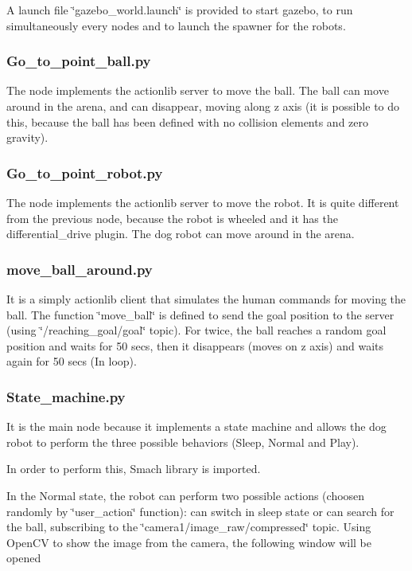 A launch file \char`\"{}gazebo\+\_\+world.\+launch\char`\"{} is provided to start gazebo, to run simultaneously every nodes and to launch the spawner for the robots.

\subsubsection*{Go\+\_\+to\+\_\+point\+\_\+ball.\+py}

The node implements the actionlib server to move the ball. The ball can move around in the arena, and can disappear, moving along z axis (it is possible to do this, because the ball has been defined with no collision elements and zero gravity).

\subsubsection*{Go\+\_\+to\+\_\+point\+\_\+robot.\+py}

The node implements the actionlib server to move the robot. It is quite different from the previous node, because the robot is wheeled and it has the differential\+\_\+drive plugin. The dog robot can move around in the arena.

\subsubsection*{move\+\_\+ball\+\_\+around.\+py}

It is a simply actionlib client that simulates the human commands for moving the ball. The function \char`\"{}move\+\_\+ball\char`\"{} is defined to send the goal position to the server (using \char`\"{}/reaching\+\_\+goal/goal\char`\"{} topic). For twice, the ball reaches a random goal position and waits for 50 secs, then it disappears (moves on z axis) and waits again for 50 secs (In loop).

\subsubsection*{State\+\_\+machine.\+py}

It is the main node because it implements a state machine and allows the dog robot to perform the three possible behaviors (Sleep, Normal and Play).

In order to perform this, Smach library is imported.

In the Normal state, the robot can perform two possible actions (choosen randomly by \char`\"{}user\+\_\+action\char`\"{} function)\+: can switch in sleep state or can search for the ball, subscribing to the \char`\"{}camera1/image\+\_\+raw/compressed\char`\"{} topic. Using Open\+CV to show the image from the camera, the following window will be opened

